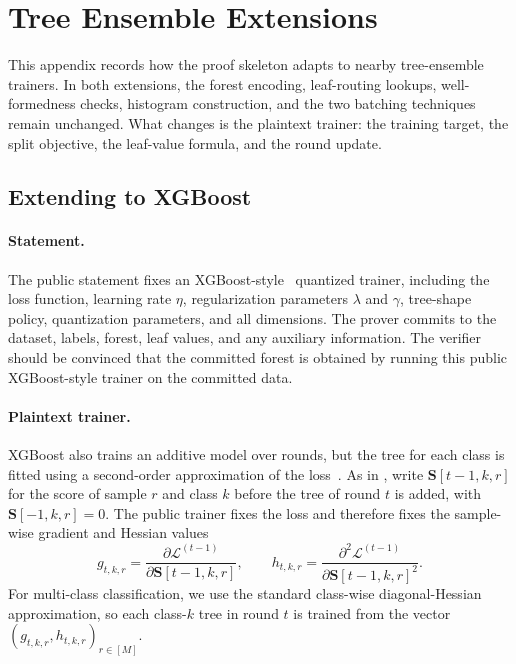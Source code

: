 \section{Tree Ensemble Extensions}\label{app:extensions}

This appendix records how the proof skeleton adapts to nearby tree-ensemble
trainers. In both extensions, the forest encoding, leaf-routing lookups,
well-formedness checks, histogram construction, and the two batching techniques
remain unchanged. What changes is the plaintext trainer: the training target,
the split objective, the leaf-value formula, and the round update.

\subsection{Extending to XGBoost}\label{app:xgboost-extension}

\paragraph{Statement.}
The public statement fixes an XGBoost-style~\cite{xgboost16} quantized trainer,
including the loss function, learning rate $\eta$, regularization parameters
$\lambda$ and $\gamma$, tree-shape policy, quantization parameters, and all
dimensions.  The prover commits to the dataset, labels, forest, leaf values,
and any auxiliary information.  The verifier should be convinced that the committed
forest is obtained by running this public XGBoost-style trainer on the
committed data.

\paragraph{Plaintext trainer.}
XGBoost also trains an additive model over rounds, but the tree for each class
is fitted using a second-order approximation of the loss~\cite{xgboost16}.  As in
, write $\mathbf{S}[t-1,k,r]$ for the score of sample $r$
and class $k$ before the tree of round $t$ is added, with
$\mathbf{S}[-1,k,r]=0$.  The public trainer fixes the loss and therefore fixes the
sample-wise gradient and Hessian values
\[
    g_{t,k,r}
    =
    \frac{\partial \mathcal{L}^{(t-1)}}{\partial \mathbf{S}[t-1,k,r]},
    \qquad
    h_{t,k,r}
    =
    \frac{\partial^2 \mathcal{L}^{(t-1)}}{\partial \mathbf{S}[t-1,k,r]^2}.
\]
For multi-class classification, we use the standard class-wise diagonal-Hessian
approximation, so each class-$k$ tree in round $t$ is trained from the vector
$(g_{t,k,r},h_{t,k,r})_{r\in[M]}$.

